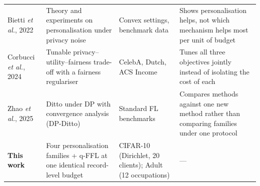 \begin{table}[!t]
\begin{tabular}{p{2.6cm}p{4.0cm}p{3.2cm}p{6.6cm}}
Bietti \emph{et al.}, 2022~\cite{bietti2022personalization} & Theory and experiments on personalisation under privacy noise & Convex settings, benchmark data & Shows personalisation helps, not which mechanism helps most per unit of budget \\
Corbucci \emph{et al.}, 2024~\cite{corbucci2024puffle} & Tunable privacy--utility--fairness trade-off with a fairness regulariser & CelebA, Dutch, ACS Income & Tunes all three objectives jointly instead of isolating the cost of each \\
Zhao \emph{et al.}, 2025~\cite{zhao2025convergence} & Ditto under DP with convergence analysis (DP-Ditto) & Standard FL benchmarks & Compares methods against one new method rather than comparing families under one protocol \\
\midrule
\textbf{This work} & Four personalisation families + q-FFL at one identical record-level budget & CIFAR-10 (Dirichlet, 20 clients); Adult (12 occupations) & --- \\
\bottomrule
\end{tabular}
\end{table}
